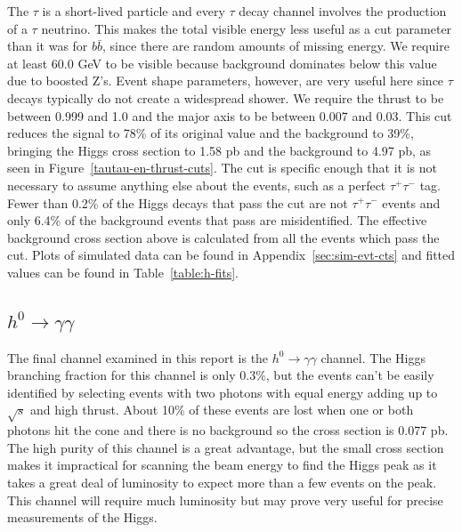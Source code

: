 \documentclass[a4paper]{article}
\begin{document}
The $\tau$ is a short-lived particle and every $\tau$ decay channel involves the production of a $\tau$ neutrino. This makes the total visible energy less useful as a cut parameter than it was for $b\bar{b}$, since there are random amounts of missing energy. We require at least 60.0 GeV to be visible because background dominates below this value due to boosted Z's. Event shape parameters, however, are very useful here since $\tau$ decays typically do not create a widespread shower. We require the thrust to be between 0.999 and 1.0 and the major axis to be between 0.007 and 0.03. This cut reduces the signal to 78\% of its original value and the background to 39\%, bringing the Higgs cross section to 1.58 pb and the background to 4.97 pb, as seen in Figure~\ref{tautau-en-thrust-cuts}. The cut is specific enough that it is not necessary to assume anything else about the events, such as a perfect $\tau^+\tau^-$ tag. Fewer than 0.2\% of the Higgs decays that pass the cut are not $\tau^+\tau^-$ events and only 6.4\% of the background events that pass are misidentified. The effective background cross section above is calculated from all the events which pass the cut. Plots of simulated data can be found in Appendix~\ref{sec:sim-evt-cts} and fitted values can be found in Table~\ref{table:h-fits}.

\subsection{$h^0\rightarrow \gamma\gamma$}
The final channel examined in this report is the $h^0\rightarrow \gamma\gamma$ channel. The Higgs branching fraction for this channel is only 0.3\%, but the events can't be easily identified by selecting events with two photons with equal energy adding up to $\sqrt{s}$ and high thrust. About 10\% of these events are lost when one or both photons hit the cone and there is no background so the cross section is 0.077 pb. The high purity of this channel is a great advantage, but the small cross section makes it impractical for scanning the beam energy to find the Higgs peak as it takes a great deal of luminosity to expect more than a few events on the peak. This channel will require much luminosity but may prove very useful for precise measurements of the Higgs.
\end{document}
